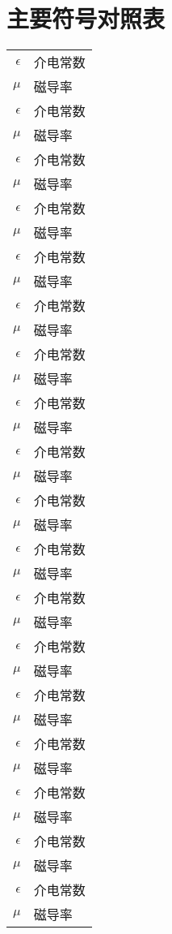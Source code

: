 \chapter{主要符号对照表}
\label{chap:symb}

\begin{longtable}{rl}
$\epsilon$     & 介电常数 \\
 $\mu$ 		& 磁导率 \\
 $\epsilon$     & 介电常数 \\
 $\mu$ 		& 磁导率 \\
 $\epsilon$     & 介电常数 \\
 $\mu$ 		& 磁导率 \\
 $\epsilon$ 	& 介电常数 \\
 $\mu$ 		& 磁导率 \\
 $\epsilon$     & 介电常数 \\
 $\mu$ 		& 磁导率 \\
 $\epsilon$     & 介电常数 \\
 $\mu$ 		& 磁导率 \\
 $\epsilon$     & 介电常数 \\
 $\mu$ 		& 磁导率 \\
 $\epsilon$ 	& 介电常数 \\
 $\mu$ 		& 磁导率 \\
 $\epsilon$     & 介电常数 \\
 $\mu$ 		& 磁导率 \\
 $\epsilon$     & 介电常数 \\
 $\mu$ 		& 磁导率 \\
 $\epsilon$     & 介电常数 \\
 $\mu$ 		& 磁导率 \\
 $\epsilon$ 	& 介电常数 \\
 $\mu$ 		& 磁导率 \\
 $\epsilon$     & 介电常数 \\
 $\mu$ 		& 磁导率 \\
 $\epsilon$     & 介电常数 \\
 $\mu$ 		& 磁导率 \\
 $\epsilon$     & 介电常数 \\
 $\mu$ 		& 磁导率 \\
 $\epsilon$ 	& 介电常数 \\
 $\mu$ 		& 磁导率 \\
 $\epsilon$     & 介电常数 \\
 $\mu$ 		& 磁导率 \\
 $\epsilon$     & 介电常数 \\
 $\mu$ 		& 磁导率 \\

\end{longtable}
